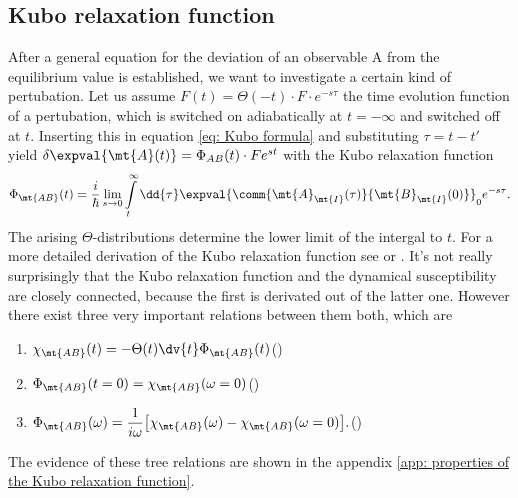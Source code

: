 \subsection{Kubo relaxation function}
\label{subsec: Kubo relaxation function}
%
%
After a general equation for the deviation of an observable A from the equilibrium value is established, we want to investigate a certain kind of pertubation.
Let us assume $F(t) = \Theta(-t) \cdot F \cdot e^{-s\tau}$ the time evolution function of a pertubation, which is switched on adiabatically at $t=-\infty$ and switched off at $t$.
Inserting this in equation \eqref{eq: Kubo formula} and substituting $\tau = t-t'$ yield $\delta\expval{\mt{A}(t)} = \Phi_{AB}(t) \cdot F e^{st}$ with the Kubo relaxation function
%
\begin{align}
	\Phi_{\mt{AB}}(t) = \frac{i}{\hbar} \lim\limits_{s \to 0} \int\limits_{t}^{\infty} \dd{\tau} \expval{\comm{\mt{A}_{\mt{I}}(\tau)}{\mt{B}_{\mt{I}}(0)}}_{0} e^{-s\tau}.
	\label{eq: Kubo relaxation function}
\end{align}
%
The arising $\Theta$-distributions determine the lower limit of the intergal to $t$.
For a more detailed derivation of the Kubo relaxation function see \cite{Schwabl} or \cite{Schwabl2}.
It's not really surprisingly that the Kubo relaxation function and the dynamical susceptibility are closely connected, because the first is derivated out of the latter one.
However there exist three very important relations between them both, which are 
%
\begin{enumerate}
	\item $\begin{aligned}[t] \chi_{\mt{AB}}(t) = -\Theta(t) \dv{t} \Phi_{\mt{AB}}(t) \end{aligned}$\hfill {}(\theequation)\label{eq: relation 1 between Phi and chi}
	\item $\begin{aligned}[t] \Phi_{\mt{AB}}(t = 0) = \chi_{\mt{AB}}(\omega = 0) \end{aligned}$\hfill {}(\theequation)\label{eq: relation 2 between Phi and chi}
	\item $\begin{aligned}[t] \Phi_{\mt{AB}}(\omega) = \frac{1}{i\omega}\big[\chi_{\mt{AB}}(\omega) - \chi_{\mt{AB}}(\omega = 0)\big]. \end{aligned}$\hfill {}(\theequation)\label{eq: relation 3 between Phi and chi}
\end{enumerate}
%
The evidence of these tree relations are shown in the appendix \ref{app: properties of the Kubo relaxation function}.

